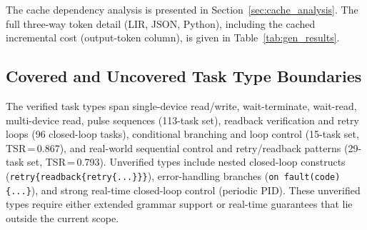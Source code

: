 \documentclass[a4paper,fleqn,longmktitle]{cas-dc}
\begin{document}
The cache dependency analysis is presented in Section~\ref{sec:cache_analysis}. The full three-way token detail (LIR, JSON, Python), including the cached incremental cost (output-token column), is given in Table~\ref{tab:gen_results}.

\subsection{Covered and Uncovered Task Type Boundaries}

The verified task types span single-device read/write, wait-terminate, wait-read, multi-device read, pulse sequences (113-task set), readback verification and retry loops (96 closed-loop tasks), conditional branching and loop control (15-task set, TSR\,=\,0.867), and real-world sequential control and retry/readback patterns (29-task set, TSR\,=\,0.793). Unverified types include nested closed-loop constructs (\texttt{retry\{readback\{retry\{...\}\}\}}), error-handling branches (\texttt{on fault(code)\{...\}}), and strong real-time closed-loop control (periodic PID). These unverified types require either extended grammar support or real-time guarantees that lie outside the current scope.

\FloatBarrier


\end{document}
